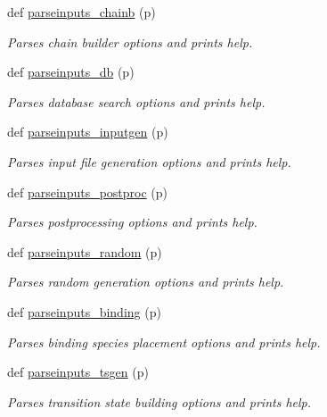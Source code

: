 \begin{DoxyCompactItemize}
def \hyperlink{namespacemolSimplify_1_1Scripts_1_1inparse_ac4c14316e76f7367738882af7c9becfb}{parseinputs\+\_\+chainb} (p)
\begin{DoxyCompactList}\small\item\em Parses chain builder options and prints help. \end{DoxyCompactList}\item 
def \hyperlink{namespacemolSimplify_1_1Scripts_1_1inparse_a515dd3cb4232166cebbe466bf42ad916}{parseinputs\+\_\+db} (p)
\begin{DoxyCompactList}\small\item\em Parses database search options and prints help. \end{DoxyCompactList}\item 
def \hyperlink{namespacemolSimplify_1_1Scripts_1_1inparse_a13962a825893d8d8a29d3b2197fb3203}{parseinputs\+\_\+inputgen} (p)
\begin{DoxyCompactList}\small\item\em Parses input file generation options and prints help. \end{DoxyCompactList}\item 
def \hyperlink{namespacemolSimplify_1_1Scripts_1_1inparse_a31f40603d68af1a3ffd07cdb38217c6a}{parseinputs\+\_\+postproc} (p)
\begin{DoxyCompactList}\small\item\em Parses postprocessing options and prints help. \end{DoxyCompactList}\item 
def \hyperlink{namespacemolSimplify_1_1Scripts_1_1inparse_ade2efa75bd64f4ac639b9dc48f461e72}{parseinputs\+\_\+random} (p)
\begin{DoxyCompactList}\small\item\em Parses random generation options and prints help. \end{DoxyCompactList}\item 
def \hyperlink{namespacemolSimplify_1_1Scripts_1_1inparse_a6e30097829594a867c72ce7647edc5dc}{parseinputs\+\_\+binding} (p)
\begin{DoxyCompactList}\small\item\em Parses binding species placement options and prints help. \end{DoxyCompactList}\item 
def \hyperlink{namespacemolSimplify_1_1Scripts_1_1inparse_aff289d30456d5d3038833050e26f61b1}{parseinputs\+\_\+tsgen} (p)
\begin{DoxyCompactList}\small\item\em Parses transition state building options and prints help. \end{DoxyCompactList}\item 

\end{DoxyCompactItemize}

